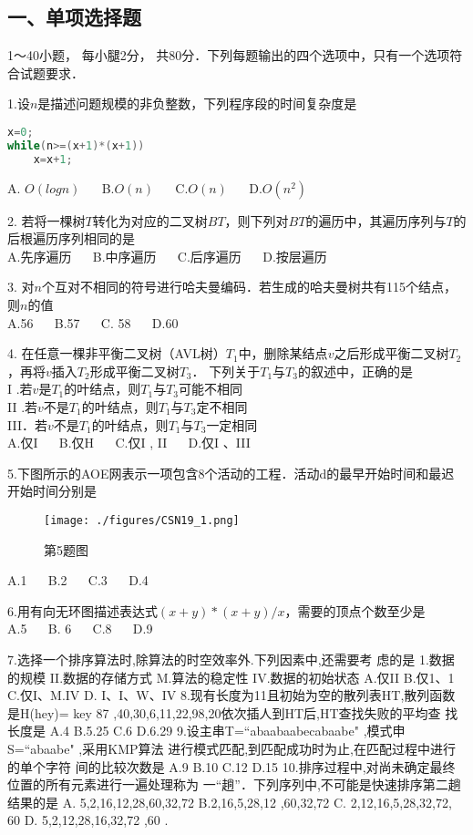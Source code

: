 
\subsection{一、单项选择题}
1～40小题， 每小腿2分， 共80分．下列每题输出的四个选项中，只有一个选项符合试题要求．

1.设$n$是描述问题规模的非负整数，下列程序段的时间复杂度是
\begin{lstlisting}[language=cpp]
x=0;
while(n>=(x+1)*(x+1))
    x=x+1;
\end{lstlisting}
A. $O(logn)$  $\quad$  B.$O(n)$  $\quad$   C.$O(n)$  $\quad$  D.$O(n^2)$

2. 若将一棵树$T$转化为对应的二叉树$BT$，则下列对$BT$的遍历中，其遍历序列与$T$的后根遍历序列相同的是 \\
A.先序遍历  $\quad$  B.中序遍历  $\quad$  C.后序遍历  $\quad$ D.按层遍历

3. 对$n$个互对不相同的符号进行哈夫曼编码．若生成的哈夫曼树共有115个结点，则$n$的值 \\
A.56  $\quad$  B.57  $\quad$  C. 58  $\quad$  D.60

4. 在任意一棵非平衡二叉树（AVL树）$T_1$中，删除某结点$v$之后形成平衡二叉树$T_2$，再将$v$插入$T_2$形成平衡二叉树$T_3$． 下列关于$T_1$与$T_3$的叙述中，正确的是 \\
I .若$v$是$T_1$的叶结点，则$T_1$与$T_3$可能不相同 \\
II .若$v$不是$T_1$的叶结点，则$T_1$与$T_3$定不相同  \\
III．若$v$不是$T_1$的叶结点，则$T_1$与$T_3$一定相同 \\
A.仅I  $\quad$  B.仅H  $\quad$ C.仅I , II  $\quad$  D.仅I 、III

5.下图所示的AOE网表示一项包含8个活动的工程．活动d的最早开始时间和最迟开始时间分别是
\begin{figure}[ht]
\centering
\texttt{[image: ./figures/CSN19\_1.png]}
\caption{第5题图} \label{CSN19_fig1}
\end{figure}
A.1  $\quad$  B.2  $\quad$  C.3  $\quad$  D.4

6.用有向无环图描述表达式$(x+y)*(x+y)/x$，需要的顶点个数至少是 \\
A.5  $\quad$  B. 6  $\quad$  C.8  $\quad$  D.9

7.选择一个排序算法时,除算法的时空效率外.下列因素中,还需要考
虑的是
1.数据的规模
II.数据的存储方式
M.算法的稳定性
IV.数据的初始状态
A.仅II
B.仅1、1
C.仅I、M.IV
D. I、I、W、IV
8.现有长度为11且初始为空的散列表HT,散列函数是H(hey)= key
87 ,40,30,6,11,22,98,20依次插人到HT后,HT查找失败的平均查
找长度是
A.4
B.5.25
C.6
D.6.29
9.设主串T=“abaabaabecabaabe" ,模式申S=“abaabe" ,采用KMP算法
进行模式匹配,到匹配成功时为止,在匹配过程中进行的单个字符
间的比较次数是
A.9
B.10
C.12
D.15
10.排序过程中,对尚未确定最终位置的所有元素进行一遍处理称为
一“趟”．下列序列中,不可能是快速排序第二趟结果的是
A. 5,2,16,12,28,60,32,72
B.2,16,5,28,12 ,60,32,72
C. 2,12,16,5,28,32,72, 60
D. 5,2,12,28,16,32,72 ,60 .


